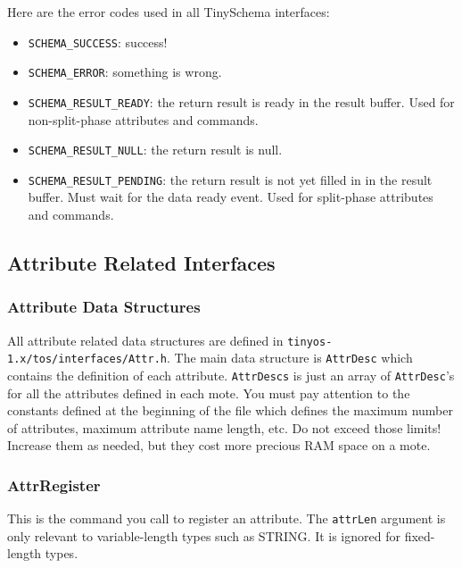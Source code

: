 \documentclass[11pt]{article}
\newcommand{\docroot}{tinyos-1.x}
\begin{document}
Here are the error codes used in all TinySchema interfaces:
\begin{itemize}
\item {\tt SCHEMA\_SUCCESS}: success!
\item {\tt SCHEMA\_ERROR}: something is wrong.
\item {\tt SCHEMA\_RESULT\_READY}: the return result is ready in the result
buffer.  Used for non-split-phase attributes and commands.
\item {\tt SCHEMA\_RESULT\_NULL}: the return result is null.
\item {\tt SCHEMA\_RESULT\_PENDING}: the return result is not yet filled in in the
result buffer.  Must wait for the data ready event.  Used for split-phase
attributes and commands.
\end{itemize}

\subsection{Attribute Related Interfaces}

\subsubsection{Attribute Data Structures}

All attribute related data structures are defined in
{\tt \docroot/tos/interfaces/Attr.h}.  The main data
structure is {\tt AttrDesc} which contains the definition
of each attribute.  {\tt AttrDescs} is just an array of
{\tt AttrDesc}'s for all the attributes defined in each mote.
You must pay attention to the constants defined at the beginning of the
file which defines the maximum number of attributes, maximum
attribute name length, etc.  Do not exceed those limits!  Increase
them as needed, but they cost more precious RAM space on a mote.

\subsubsection{AttrRegister}


This is the command you call to register an attribute.  The {\tt attrLen} 
argument is only relevant to variable-length types such as STRING.
It is ignored for fixed-length types.


\end{document}
